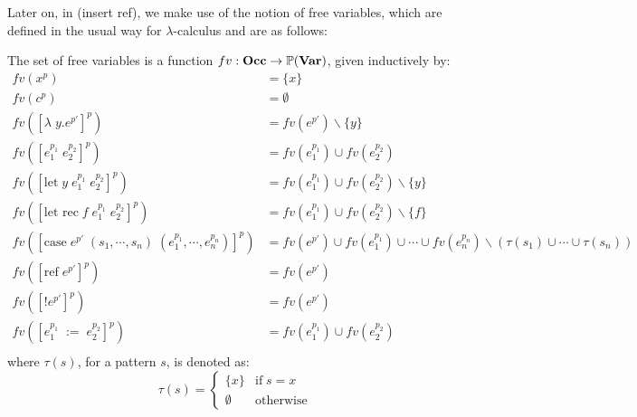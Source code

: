 \documentclass[../../master.tex]{subfiles}
\begin{document}
Later on, in (insert ref), we make use of the notion of free variables, which are defined in the usual way for $\lambda$-calculus and are as follows:
\begin{definition}\label{def:fv}
	The set of free variables is a function $fv:\textbf{Occ}\rightarrow\mathbb{P}(\textbf{Var})$, given inductively by:
	\begin{align*}
		fv(x^p)&=\{x\}\\
		fv(c^p)&=\emptyset\\
		fv([\lambda\;y.e^{p'}]^p)&=fv(e^{p'})\backslash\{y\}\\
		fv([e_1^{p_1}\;e_2^{p_2}]^p)&=fv(e_1^{p_1})\cup fv(e_2^{p_2})\\
		fv([\mbox{let}\;y\;e_1^{p_1}\;e_2^{p_2}]^p)&=fv(e_1^{p_1})\cup fv(e_2^{p_2})\backslash\{y\}\\
		fv([\mbox{let rec}\;f\;e_1^{p_1}\;e_2^{p_2}]^p)&=fv(e_1^{p_1})\cup fv(e_2^{p_2})\backslash\{f\}\\
		fv([\mbox{case}\;e^{p'}\;(s_1,\cdots,s_n)\;(e_1^{p_1},\cdots,e_n^{p_n})]^p)&=fv(e^{p'})\cup fv(e_1^{p_1})\cup\cdots\cup fv(e_n^{p_n})\backslash(\tau(s_1)\cup\cdots\cup\tau(s_n))\\
		fv([\mbox{ref}\;e^{p'}]^p)&=fv(e^{p'})\\
		fv([!e^{p'}]^p)&=fv(e^{p'})\\
		fv([e_1^{p_1}\;:=\;e_2^{p_2}]^p)&=fv(e_1^{p_1})\cup fv(e_2^{p_2})\\
	\end{align*}
	where $\tau(s)$, for a pattern $s$, is denoted as:
	$$
	\tau(s)=
		\left\{\begin{matrix}
			\{x\} & \mbox{if}\;s=x\\ 
			\emptyset & \mbox{otherwise}
		\end{matrix}\right.
	$$
\end{definition}
\end{document}
